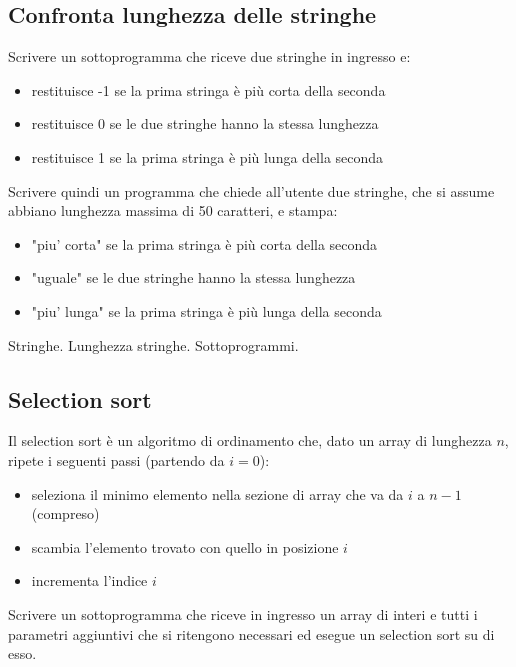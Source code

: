 \subsection{Confronta lunghezza delle stringhe}

Scrivere un sottoprogramma che riceve due stringhe in ingresso e:
\begin{itemize}
    \item restituisce -1 se la prima stringa \`e pi\`u corta della seconda
    \item restituisce 0 se le due stringhe hanno la stessa lunghezza
    \item restituisce 1 se la prima stringa \`e pi\`u lunga della seconda
\end{itemize}


Scrivere quindi un programma che chiede all'utente due stringhe, che si assume abbiano lunghezza massima di 50 caratteri, e stampa:
\begin{itemize}
    \item "piu' corta" se la prima stringa \`e pi\`u corta della seconda
    \item "uguale" se le due stringhe hanno la stessa lunghezza
    \item "piu' lunga" se la prima stringa \`e pi\`u lunga della seconda
\end{itemize}

\begin{tags}
Stringhe. Lunghezza stringhe. Sottoprogrammi.
\end{tags}


\subsection{Selection sort}
Il selection sort \`e un algoritmo di ordinamento che, dato un array di lunghezza $n$, ripete i seguenti passi (partendo da $i = 0$):
\begin{itemize}
    \item seleziona il minimo elemento nella sezione di array che va da $i$ a $n-1$ (compreso)
    \item scambia l'elemento trovato con quello in posizione $i$
    \item incrementa l'indice $i$
\end{itemize}

Scrivere un sottoprogramma che riceve in ingresso un array di interi e tutti i parametri aggiuntivi
che si ritengono necessari ed esegue un selection sort su di esso.

